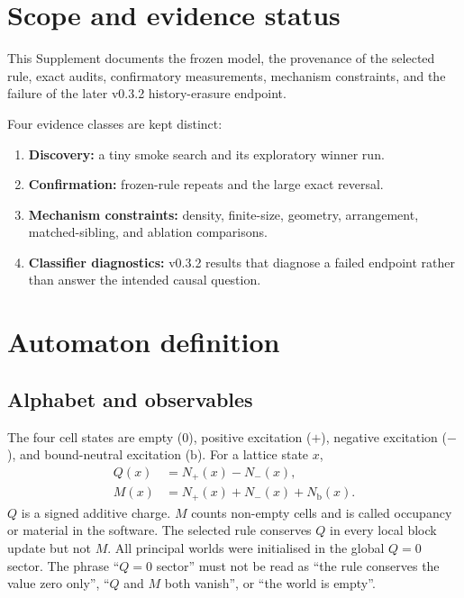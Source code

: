 \documentclass[11pt,a4paper]{article}
\begin{document}

\tableofcontents

\section{Scope and evidence status}
This Supplement documents the frozen model, the provenance of the selected rule, exact audits, confirmatory measurements, mechanism constraints, and the failure of the later v0.3.2 history-erasure endpoint.

Four evidence classes are kept distinct:
\begin{enumerate}
\item \textbf{Discovery:} a tiny smoke search and its exploratory winner run.
\item \textbf{Confirmation:} frozen-rule repeats and the large exact reversal.
\item \textbf{Mechanism constraints:} density, finite-size, geometry, arrangement, matched-sibling, and ablation comparisons.
\item \textbf{Classifier diagnostics:} v0.3.2 results that diagnose a failed endpoint rather than answer the intended causal question.
\end{enumerate}

\section{Automaton definition}
\subsection{Alphabet and observables}
The four cell states are empty ($0$), positive excitation ($+$), negative excitation ($-$), and bound-neutral excitation ($\mathrm b$). For a lattice state $x$,
\begin{align}
Q(x)&=N_{+}(x)-N_{-}(x),\\
M(x)&=N_{+}(x)+N_{-}(x)+N_{\mathrm b}(x).
\end{align}
$Q$ is a signed additive charge. $M$ counts non-empty cells and is called occupancy or material in the software. The selected rule conserves $Q$ in every local block update but not $M$. All principal worlds were initialised in the global $Q=0$ sector. The phrase ``$Q=0$ sector'' must not be read as ``the rule conserves the value zero only'', ``$Q$ and $M$ both vanish'', or ``the world is empty''.
\end{document}
